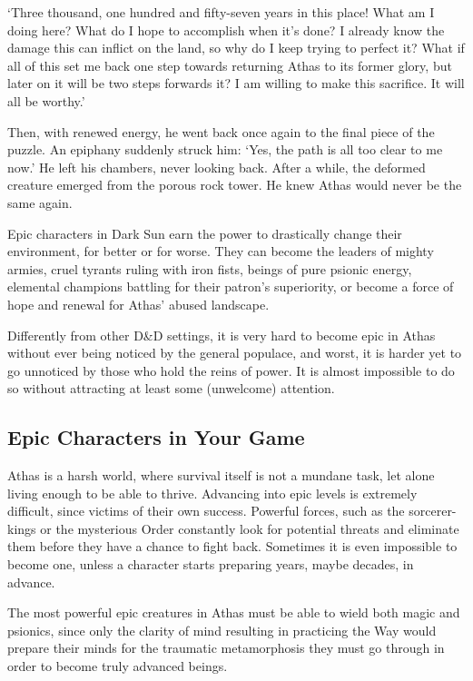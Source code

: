 {
`Three thousand, one hundred and fifty-seven years in this place! What am I doing here? What do I hope to accomplish when it's done? I already know the damage this can inflict on the land, so why do I keep trying to perfect it? What if all of this set me back one step towards returning Athas to its former glory, but later on it will be two steps forwards it? I am willing to make this sacrifice. It will all be worthy.'

Then, with renewed energy, he went back once again to the final piece of the puzzle. An epiphany suddenly struck him: `Yes, the path is all too clear to me now.' He left his chambers, never looking back. After a while, the deformed creature emerged from the porous rock tower. He knew Athas would never be the same again.
}{}

Epic characters in {\tableheader Dark Sun} earn the power to drastically change their environment, for better or for worse. They can become the leaders of mighty armies, cruel tyrants ruling with iron fists, beings of pure psionic
energy, elemental champions battling for their patron's superiority, or become a force of hope and renewal for Athas' abused landscape.

Differently from other {\tableheader D\&D} settings, it is very hard to become epic in Athas without ever being noticed by the general populace, and worst, it is harder yet to go unnoticed by those who hold the reins of power. It is almost impossible to do so without attracting at least some (unwelcome) attention.

\subsection{Epic Characters in Your Game}
Athas is a harsh world, where survival itself is not a mundane task, let alone living enough to be able to thrive. Advancing into epic levels is extremely difficult, since victims of their own success. Powerful forces, such as the sorcerer-kings or the mysterious Order constantly look for potential threats and eliminate them before they have a
chance to fight back. Sometimes it is even impossible to become one, unless a character starts preparing years, maybe decades, in advance.

The most powerful epic creatures in Athas must be able to wield both magic and psionics, since only the clarity of mind resulting in practicing the Way would prepare their minds for the traumatic metamorphosis they must go through in order to become truly advanced beings.


